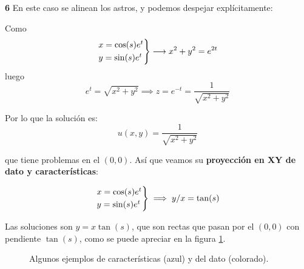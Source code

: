 \begin{example}{\bf 6}
		En este caso se alinean los astros, y podemos despejar explícitamente:

		Como
		\[
		\begin{rcases}
			x = \cos (s) e^t\\
			y = \sin (s) e^t
		\end{rcases}
		 \longrightarrow x^2 + y^2 = e^{2t} \]
		luego
		\[e^t = \sqrt{x^2 + y^2} \implies z = e^{-t} = \frac{1}{\sqrt{x^2 + y^2}} \]

		Por lo que la solución es:
		\[ u(x,y) = \frac{1}{\sqrt{x^2+y^2}}\]

		que tiene problemas en el $(0,0)$. Así que veamos su {\bf proyección en XY de dato y características}:

		\[
		\begin{rcases}
			x = \cos (s) e^t\\
			y = \sin (s) e^t
		\end{rcases}
		\implies y/x = \tan(s) \]

		Las soluciones son ${y = x \tan(s)}$, que son rectas que pasan por el $(0,0)$ con pendiente $\tan(s)$, como se puede apreciar en la figura \ref{fig:Proy-XY-ejemplo-6}.

		\begin{figure}[hbtp]
			\caption{Algunos ejemplos de características (azul) y del dato (colorado).}
			\label{fig:Proy-XY-ejemplo-6}
		\end{figure}

	\end{example}

